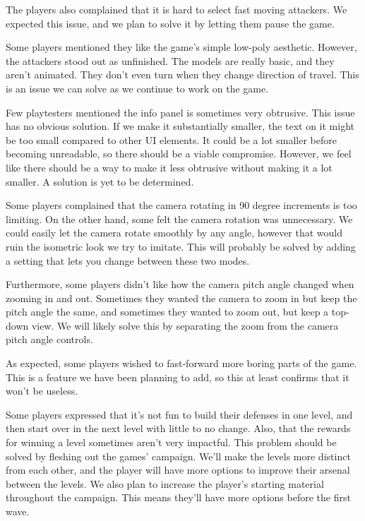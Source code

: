 The players also complained that it is hard to select fast moving attackers.
We expected this issue, and we plan to solve it by letting them pause the game.

Some players mentioned they like the game's simple low-poly aesthetic.
However, the attackers stood out as unfinished.
The models are really basic, and they aren't animated.
They don't even turn when they change direction of travel.
This is an issue we can solve as we continue to work on the game.

Few playtesters mentioned the info panel is sometimes very obtrusive.
This issue has no obvious solution.
If we make it substantially smaller, the text on it might be too small compared to other UI elements.
It could be a lot smaller before becoming unreadable, so there should be a viable compromise.
However, we feel like there should be a way to make it less obtrusive without making it a lot smaller.
A solution is yet to be determined.

Some players complained that the camera rotating in 90 degree increments is too limiting.
On the other hand, some felt the camera rotation was unnecessary.
We could easily let the camera rotate smoothly by any angle, however that would ruin the isometric look we try to imitate.
This will probably be solved by adding a setting that lets you change between these two modes.

Furthermore, some players didn't like how the camera pitch angle changed when zooming in and out.
Sometimes they wanted the camera to zoom in but keep the pitch angle the same, and sometimes they wanted to zoom out, but keep a top-down view.
We will likely solve this by separating the zoom from the camera pitch angle controls.

As expected, some players wished to fast-forward more boring parts of the game.
This is a feature we have been planning to add, so this at least confirms that it won't be useless.

Some players expressed that it's not fun to build their defenses in one level, and then start over in the next level with little to no change.
Also, that the rewards for winning a level sometimes aren't very impactful.
This problem should be solved by fleshing out the games' campaign.
We'll make the levels more distinct from each other, and the player will have more options to improve their arsenal between the levels.
We also plan to increase the player's starting material throughout the campaign.
This means they'll have more options before the first wave.

